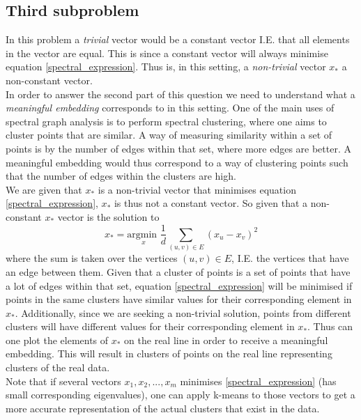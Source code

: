 \subsection*{Third subproblem}
In this problem a \textit{trivial} vector would be a constant vector I.E. that all elements in the vector are equal. This is since a constant vector will always minimise equation \eqref{spectral_expression}. Thus is, in this setting, a \textit{non-trivial} vector $x_*$ a non-constant vector. \\

In order to answer the second part of this question we need to understand what a \textit{meaningful embedding} corresponds to in this setting. One of the main uses of spectral graph analysis is to perform spectral clustering, where one aims to cluster points that are similar. A way of measuring similarity within a set of points is by the number of edges within that set, where more edges are better. A meaningful embedding would thus correspond to a way of clustering points such that the number of edges within the clusters are high.\\

We are given that $x_*$ is a non-trivial vector that minimises equation \eqref{spectral_expression}, $x_*$ is thus not a constant vector. So given that a non-constant $x_*$ vector is the solution to
\begin{equation}
  x_* = \underset{x}{\text{argmin }} \frac{1}{d} \sum_{(u, v) \in E}\left(x_{u}-x_{v}\right)^{2}
\end{equation}
where the sum is taken over the vertices $(u, v) \in E$, I.E. the vertices that have an edge between them. Given that a cluster of points is a set of points that have a lot of edges within that set, equation \eqref{spectral_expression} will be minimised if points in the same clusters have similar values for their corresponding element in $x_*$. Additionally, since we are seeking a non-trivial solution, points from different clusters will have different values for their corresponding element in $x_*$. Thus can one plot the elements of $x_*$ on the real line in order to receive a meaningful embedding. This will result in clusters of points on the real line representing clusters of the real data. \\

Note that if several vectors $x_1, x_2, ..., x_m$ minimises \eqref{spectral_expression} (has small corresponding eigenvalues), one can apply k-means to those vectors to get a more accurate representation of the actual clusters that exist in the data.
